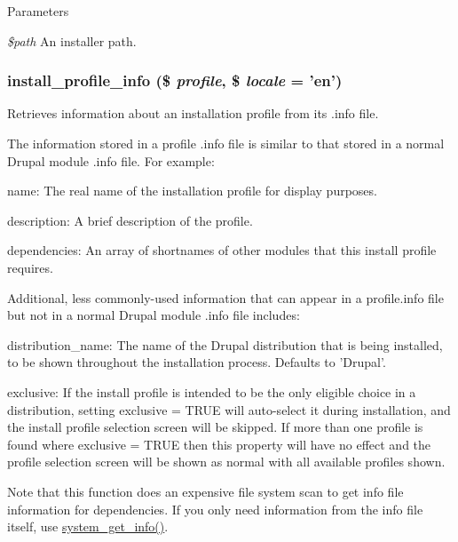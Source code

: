 \begin{DoxyParams}{Parameters}
\item[{\em \$path}]An installer path. \end{DoxyParams}
\hypertarget{install_8inc_ad035099993d5a0dc4bad7ce81264c88d}{
\subsubsection[{install\_\-profile\_\-info}]{\setlength{\rightskip}{0pt plus 5cm}install\_\-profile\_\-info (\$ {\em profile}, \/  \$ {\em locale} = {\ttfamily 'en'})}}
\label{install_8inc_ad035099993d5a0dc4bad7ce81264c88d}
Retrieves information about an installation profile from its .info file.

The information stored in a profile .info file is similar to that stored in a normal Drupal module .info file. For example:
\begin{DoxyItemize}
\item name: The real name of the installation profile for display purposes.
\item description: A brief description of the profile.
\item dependencies: An array of shortnames of other modules that this install profile requires.
\end{DoxyItemize}

Additional, less commonly-\/used information that can appear in a profile.info file but not in a normal Drupal module .info file includes:
\begin{DoxyItemize}
\item distribution\_\-name: The name of the Drupal distribution that is being installed, to be shown throughout the installation process. Defaults to 'Drupal'.
\item exclusive: If the install profile is intended to be the only eligible choice in a distribution, setting exclusive = TRUE will auto-\/select it during installation, and the install profile selection screen will be skipped. If more than one profile is found where exclusive = TRUE then this property will have no effect and the profile selection screen will be shown as normal with all available profiles shown.
\end{DoxyItemize}

Note that this function does an expensive file system scan to get info file information for dependencies. If you only need information from the info file itself, use \hyperlink{system_8module_af54208dab08c482b465a7f10225ebbb7}{system\_\-get\_\-info()}.


